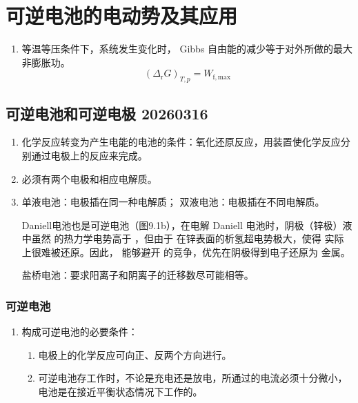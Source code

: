 \section{可逆电池的电动势及其应用}

\begin{enumerate}
    \item 等温等压条件下，系统发生变化时， Gibbs 自由能的减少等于对外所做的最大非膨胀功。
    \begin{equation*}
        (\Delta_{\mathrm{r}}G)_{T,p} = W_{\mathrm{f,max}}
    \end{equation*}
\end{enumerate}

\subsection{可逆电池和可逆电极 20260316}

\begin{enumerate}
    \item 化学反应转变为产生电能的电池的条件：氧化还原反应，用装置使化学反应分别通过电极上的反应来完成。
    \item 必须有两个电极和相应电解质。
    \item 单液电池：电极插在同一种电解质；
    双液电池：电极插在不同电解质。
    
    Daniell电池也是可逆电池（图9.1b），在电解 Daniell 电池时，阴极（锌极）液中虽然  的热力学电势高于 ，但由于  在锌表面的析氢超电势极大，使得  实际上很难被还原。因此， 能够避开  的竞争，优先在阴极得到电子还原为  金属。

    盐桥电池：要求阳离子和阴离子的迁移数尽可能相等。
\end{enumerate}

\subsubsection{可逆电池}

\begin{enumerate}
    \item 构成可逆电池的必要条件：
    \begin{enumerate}
        \item 电极上的化学反应可向正、反两个方向进行。
        \item 可逆电池存工作时，不论是充电还是放电，所通过的电流必须十分微小，电池是在接近平衡状态情况下工作的。
    \end{enumerate}
\end{enumerate}

